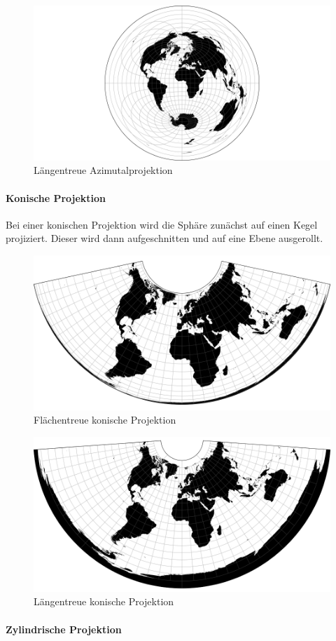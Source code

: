 \begin{figure}[H]
    \centering
    
    \includegraphics[width=.5\textwidth]{images/azimuthalEquidistant}
    \caption{Längentreue Azimutalprojektion}
\end{figure}

\paragraph{Konische Projektion}

Bei einer konischen Projektion wird die Sphäre zunächst auf einen Kegel projiziert. Dieser wird dann aufgeschnitten und auf eine Ebene ausgerollt.

\begin{figure}[H]
    \centering
    
    \includegraphics[width=.5\textwidth]{images/conicEqualArea}
    \caption{Flächentreue konische Projektion}
\end{figure}

\begin{figure}[H]
    \centering
    
    \includegraphics[width=.5\textwidth]{images/conicEquidistant}
    \caption{Längentreue konische Projektion}
\end{figure}

\paragraph{Zylindrische Projektion}

